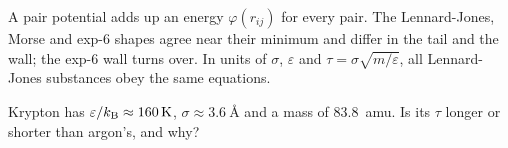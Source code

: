 \begin{keyidea}
A pair potential adds up an energy $\varphi(r_{ij})$ for every pair. The
Lennard-Jones, Morse and exp-6 shapes agree near their minimum and differ
in the tail and the wall; the exp-6 wall turns over. In units of
$\sigma$, $\varepsilon$ and $\tau = \sigma\sqrt{m/\varepsilon}$, all
Lennard-Jones substances obey the same equations.
\end{keyidea}


\begin{selfcheck}
Krypton has $\varepsilon/k_{\mathrm{B}} \approx \SI{160}{\kelvin}$, $\sigma \approx
\SI{3.6}{\angstrom}$ and a mass of \SI{83.8}{amu}. Is its $\tau$ longer or
shorter than argon's, and why?
\end{selfcheck}
